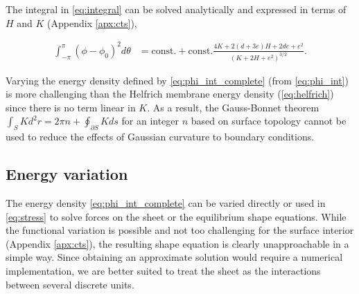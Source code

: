The integral in \cref{eq:integral} can be solved analytically and expressed in terms of $H$ and $K$ (Appendix \ref{apx:cts}), 

\begin{align}
    \int_{-\pi}^\pi (\phi - \phi_0)^2 d\theta &= \text{const.} + \text{const.} \frac{4 K + 2(d+3e)H + 2de + e^2}{(K + 2H + e^2)^{3/2}}. \label{eq:phi_int_complete}
\end{align}

Varying the energy density defined by \cref{eq:phi_int_complete} (from \cref{eq:phi_int}) is more challenging than the Helfrich membrane energy density (\cref{eq:helfrich}) since there is no term linear in $K$. 
As a result, the Gauss-Bonnet theorem $\int_S K d^2r = 2\pi n + \oint_{\partial S} K ds$ for an integer $n$ based on surface topology cannot be used to reduce the effects of Gaussian curvature to boundary conditions.

\subsection{Energy variation}

The energy density \cref{eq:phi_int_complete} can be varied directly or used in \cref{eq:stress} to solve forces on the sheet or the equilibrium shape equations.
While the functional variation is possible and not too challenging for the surface interior (Appendix \ref{apx:cts}), the resulting shape equation is clearly unapproachable in a simple way.
Since obtaining an approximate solution would require a numerical implementation, we are better suited to treat the sheet as the interactions between several discrete units.

